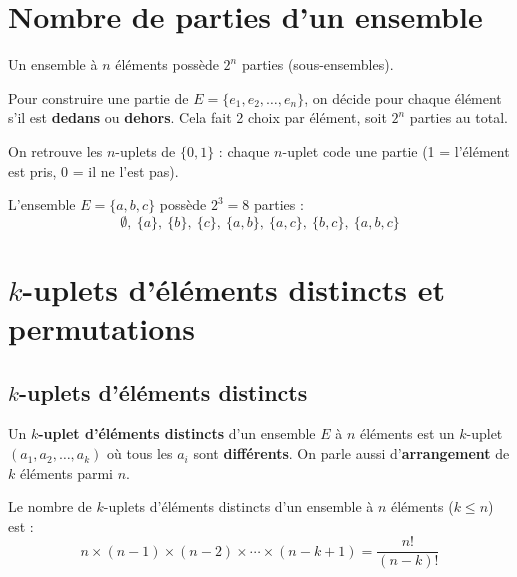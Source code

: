 \documentclass[12pt,a4paper,twoside]{book}
\begin{document}
\section{Nombre de parties d'un ensemble}

\begin{propriete}
Un ensemble à $n$ éléments possède $2^n$ parties (sous-ensembles).
\end{propriete}

\begin{methode}[Comprendre le $2^n$]
Pour construire une partie de $E = \{e_1, e_2, \ldots, e_n\}$, on décide pour chaque élément s'il est \textbf{dedans} ou \textbf{dehors}. Cela fait 2 choix par élément, soit $2^n$ parties au total.

On retrouve les $n$-uplets de $\{0, 1\}$ : chaque $n$-uplet code une partie (1 = l'élément est pris, 0 = il ne l'est pas).
\end{methode}

\begin{exemple}
L'ensemble $E = \{a, b, c\}$ possède $2^3 = 8$ parties :
\[ \emptyset,\ \{a\},\ \{b\},\ \{c\},\ \{a,b\},\ \{a,c\},\ \{b,c\},\ \{a,b,c\} \]
\end{exemple}

\section{$k$-uplets d'éléments distincts et permutations}

\subsection{$k$-uplets d'éléments distincts}

\begin{definition}
Un \textbf{$k$-uplet d'éléments distincts} d'un ensemble $E$ à $n$ éléments est un $k$-uplet $(a_1, a_2, \ldots, a_k)$ où tous les $a_i$ sont \textbf{différents}. On parle aussi d'\textbf{arrangement} de $k$ éléments parmi $n$.
\end{definition}

\begin{propriete}
Le nombre de $k$-uplets d'éléments distincts d'un ensemble à $n$ éléments ($k \leqslant n$) est :
\[ n \times (n-1) \times (n-2) \times \cdots \times (n-k+1) = \frac{n!}{(n-k)!} \]
\end{propriete}
\end{document}
